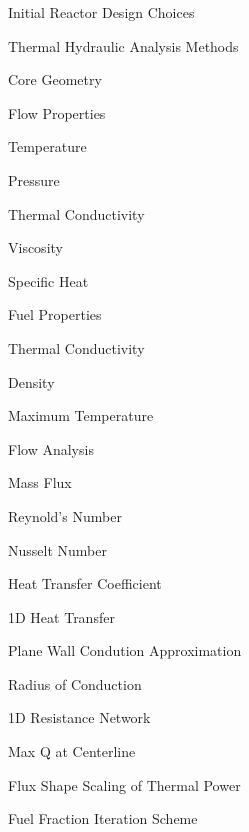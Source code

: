 \documentclass{report}
\begin{document}
\begin{outline}
\begin{outline}
      \item { Initial Reactor Design Choices }
      \item { Thermal Hydraulic Analysis Methods }
          \begin{outline}
          \item { Core Geometry }
          \item { Flow Properties }
              \begin{outline}
              \item { Temperature }
              \item { Pressure }
              \item { Thermal Conductivity }
              \item { Viscosity }
              \item { Specific Heat }
              \end{outline}
          \item { Fuel Properties }
              \begin{outline}
              \item { Thermal Conductivity }
              \item { Density }
              \item { Maximum Temperature }
              \end{outline}
          \item { Flow Analysis}
              \begin{outline}
              \item { Mass Flux }
              \item { Reynold's Number }
              \item { Nusselt Number }
              \item { Heat Transfer Coefficient }
              \end{outline}
          \item { 1D Heat Transfer }
              \begin{outline}
              \item { Plane Wall Condution Approximation }
              \item { Radius of Conduction }
              \item { 1D Resistance Network }
              \item { Max Q at Centerline }
              \item { Flux Shape Scaling of Thermal Power}
              \end{outline}
          \item { Fuel Fraction Iteration Scheme }

\end{outline}
\end{outline}
\end{outline}
\end{document}
